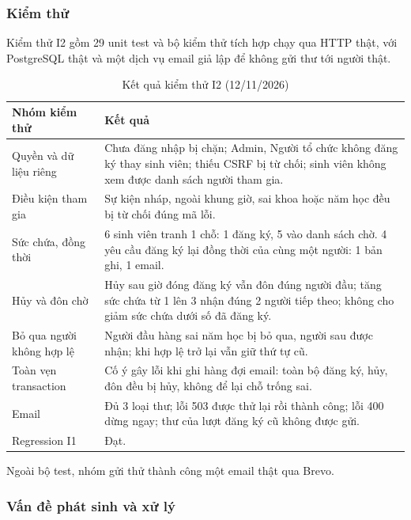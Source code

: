 \subsubsection{Kiểm thử}

Kiểm thử I2 gồm 29 unit test và bộ kiểm thử tích hợp chạy qua HTTP thật, với PostgreSQL thật và một dịch vụ email giả lập để không gửi thư tới người thật.

\begin{table}[H]
\centering\small
\caption{Kết quả kiểm thử I2 (12/11/2026)}\label{tab:i2-tests}
\begin{tabularx}{\linewidth}{@{}p{.22\linewidth}X@{}}
\toprule
\textbf{Nhóm kiểm thử} & \textbf{Kết quả}\\\midrule
Quyền và dữ liệu riêng & Chưa đăng nhập bị chặn; Admin, Người tổ chức không đăng ký thay sinh viên; thiếu CSRF bị từ chối; sinh viên không xem được danh sách người tham gia.\\
Điều kiện tham gia & Sự kiện nháp, ngoài khung giờ, sai khoa hoặc năm học đều bị từ chối đúng mã lỗi.\\
Sức chứa, đồng thời & 6 sinh viên tranh 1 chỗ: 1 đăng ký, 5 vào danh sách chờ. 4 yêu cầu đăng ký lại đồng thời của cùng một người: 1 bản ghi, 1 email.\\
Hủy và đôn chờ & Hủy sau giờ đóng đăng ký vẫn đôn đúng người đầu; tăng sức chứa từ 1 lên 3 nhận đúng 2 người tiếp theo; không cho giảm sức chứa dưới số đã đăng ký.\\
Bỏ qua người không hợp lệ & Người đầu hàng sai năm học bị bỏ qua, người sau được nhận; khi hợp lệ trở lại vẫn giữ thứ tự cũ.\\
Toàn vẹn transaction & Cố ý gây lỗi khi ghi hàng đợi email: toàn bộ đăng ký, hủy, đôn đều bị hủy, không để lại chỗ trống sai.\\
Email & Đủ 3 loại thư; lỗi 503 được thử lại rồi thành công; lỗi 400 dừng ngay; thư của lượt đăng ký cũ không được gửi.\\
Regression I1 & Đạt.\\
\bottomrule
\end{tabularx}
\end{table}

Ngoài bộ test, nhóm gửi thử thành công một email thật qua Brevo.

\subsubsection{Vấn đề phát sinh và xử lý}

